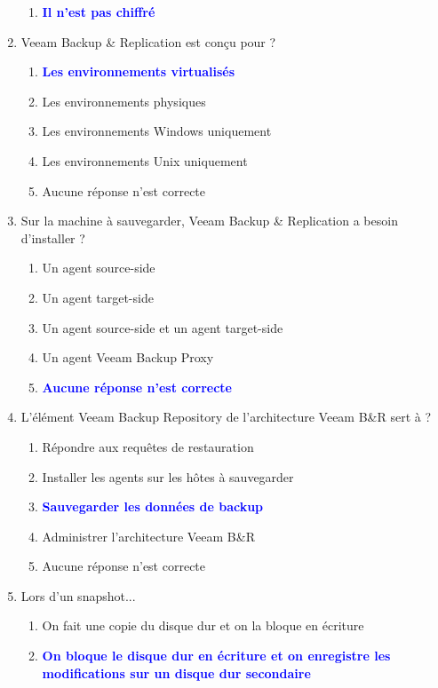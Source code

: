 \documentclass[a4paper]{article}
\begin{document}
\begin{enumerate}
\begin{enumerate}
        \item \textcolor{blue}{\textbf{Il n'est pas chiffré}}
    \end{enumerate}
    \item Veeam Backup \& Replication est conçu pour ?
    \begin{enumerate}
        \item \textcolor{blue}{\textbf{Les environnements virtualisés}}
        \item Les environnements physiques
        \item Les environnements Windows uniquement
        \item Les environnements Unix uniquement
        \item Aucune réponse n'est correcte
    \end{enumerate}
    \item Sur la machine à sauvegarder, Veeam Backup \& Replication a besoin d'installer ?
    \begin{enumerate}
        \item Un agent source-side
        \item Un agent target-side
        \item Un agent source-side et un agent target-side
        \item Un agent Veeam Backup Proxy
        \item \textcolor{blue}{\textbf{Aucune réponse n'est correcte}}
    \end{enumerate}
    \item L'élément Veeam Backup Repository de l'architecture Veeam B\&R sert à ?
    \begin{enumerate}
        \item Répondre aux requêtes de restauration
        \item Installer les agents sur les hôtes à sauvegarder
        \item \textcolor{blue}{\textbf{Sauvegarder les données de backup}}
        \item Administrer l'architecture Veeam B\&R
        \item Aucune réponse n'est correcte
    \end{enumerate}
    \item Lors d'un snapshot...
    \begin{enumerate}
        \item On fait une copie du disque dur et on la bloque en écriture
        \item \textcolor{blue}{\textbf{On bloque le disque dur en écriture et on enregistre les modifications sur un disque dur secondaire}}

\end{enumerate}
\end{enumerate}
\end{document}
